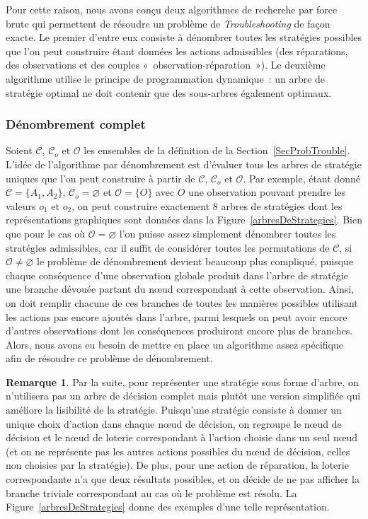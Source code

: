 \documentclass[a4paper,11pt]{article}
\theoremstyle{plain}
\theoremstyle{definition}
\newtheorem*{remk}{Remarque}
\begin{document}
Pour cette raison, nous avons conçu deux algorithmes de recherche par force brute qui permettent de résoudre un problème de \emph{Troubleshooting} de façon exacte. Le premier d'entre eux consiste à dénombrer toutes les stratégies possibles que l'on peut construire étant données les actions admissibles (des réparations, des observations et des couples «~observation-réparation~»). Le deuxième algorithme utilise le principe de programmation dynamique~: un arbre de stratégie optimal ne doit contenir que des sous-arbres également optimaux.

\subsubsection{Dénombrement complet}
\label{SecDenombrComplet}

Soient $\mathcal C$, $\mathcal C_o$ et $\mathcal O$ les ensembles de la définition de la Section~\ref{SecProbTrouble}. L'idée de l'algorithme par dénombrement est d'évaluer tous les arbres de stratégie uniques que l'on peut construire à partir de $\mathcal C$, $ \mathcal C_o$ et $\mathcal O$. Par exemple, étant donné $\mathcal C = \{A_1, A_2\}$, $\mathcal C_o = \varnothing$ et $\mathcal O = \{O\}$ avec $O$ une observation pouvant prendre les valeurs $o_1$ et $o_2$, on peut construire exactement 8 arbres de stratégies dont les représentations graphiques sont données dans la Figure~\ref{arbresDeStrategies}. Bien que pour le cas où $\mathcal O = \varnothing$ l'on puisse assez simplement dénombrer toutes les stratégies admissibles, car il suffit de considérer toutes les permutations de $\mathcal C$, si  $\mathcal O \neq \varnothing$ le problème de dénombrement devient beaucoup plus compliqué, puisque chaque conséquence d'une observation globale produit dans l'arbre de stratégie une branche dévouée partant du nœud correspondant à cette observation. Ainsi, on doit remplir chacune de ces branches de toutes les manières possibles utilisant les actions pas encore ajoutés dans l'arbre, parmi lesquels on peut avoir encore d'autres observations dont les conséquences produiront encore plus de branches. Alors, nous avons eu besoin de mettre en place un algorithme assez spécifique afin de résoudre ce problème de dénombrement.

\begin{remk}
Par la suite, pour représenter une stratégie sous forme d'arbre, on n'utilisera pas un arbre de décision complet mais plutôt une version simplifiée qui améliore la lisibilité de la stratégie. Puisqu'une stratégie consiste à donner un unique choix d'action dans chaque nœud de décision, on regroupe le nœud de décision et le nœud de loterie correspondant à l'action choisie dans un seul nœud (et on ne représente pas les autres actions possibles du nœud de décision, celles non choisies par la stratégie). De plus, pour une action de réparation, la loterie correspondante n'a que deux résultats possibles, et on décide de ne pas afficher la branche triviale correspondant au cas où le problème est résolu. La Figure~\ref{arbresDeStrategies} donne des exemples d'une telle représentation.
\end{remk}
\end{document}

